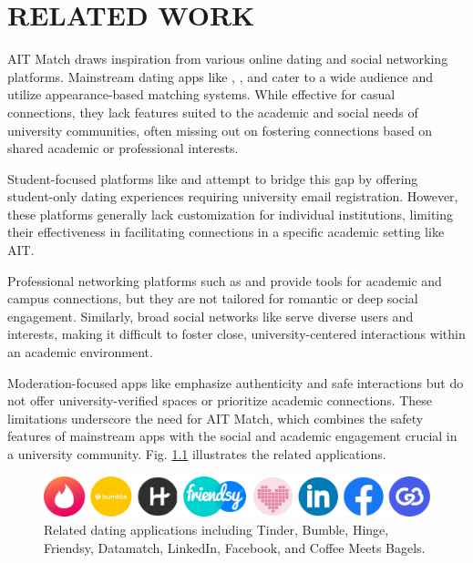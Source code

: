 \setlength{\footskip}{8mm}

\chapter{RELATED WORK}
AIT Match draws inspiration from various online dating and social networking platforms. Mainstream dating apps like \citeauthor{tinder2024}, \citeauthor{bumble2024}, and \citeauthor{hinge2024} cater to a wide audience and utilize appearance-based matching systems. While effective for casual connections, they lack features suited to the academic and social needs of university communities, often missing out on fostering connections based on shared academic or professional interests.

Student-focused platforms like \citeauthor{friendsy2024} and \citeauthor{datamatch2024} attempt to bridge this gap by offering student-only dating experiences requiring university email registration. However, these platforms generally lack customization for individual institutions, limiting their effectiveness in facilitating connections in a specific academic setting like AIT.

Professional networking platforms such as \citeauthor{linkedin2024} and \citeauthor{facebookcampus2024} provide tools for academic and campus connections, but they are not tailored for romantic or deep social engagement. Similarly, broad social networks like \citeauthor{facebook2024} serve diverse users and interests, making it difficult to foster close, university-centered interactions within an academic environment. 

Moderation-focused apps like \citeauthor{coffeemeetsbagel2024} emphasize authenticity and safe interactions but do not offer university-verified spaces or prioritize academic connections. These limitations underscore the need for AIT Match, which combines the safety features of mainstream apps with the social and academic engagement crucial in a university community. Fig. \ref{fig:datingapps} illustrates the related applications.\newline

\begin{figure}[h]
    \centering %
    \captionsetup{justification=centering, singlelinecheck=false, labelsep=space} %
    \includegraphics[width=5.7in]{figures/datingapps.png} %
    \caption{Related dating applications including Tinder, Bumble, Hinge, Friendsy, Datamatch, LinkedIn, Facebook, and Coffee Meets Bagels.}
    \label{fig:datingapps}
\end{figure}



